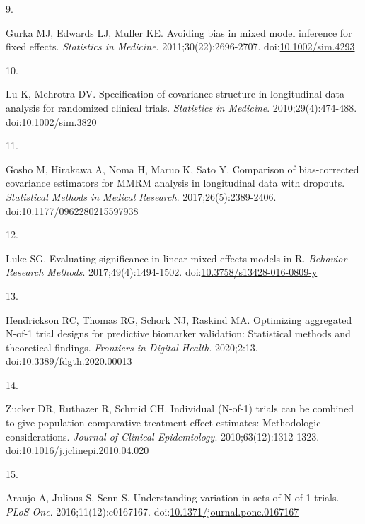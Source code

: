 \documentclass[
  11pt,
]{article}
\newlength{\cslhangindent}
\newlength{\csllabelwidth}
\newenvironment{CSLReferences}[2] %
 {\begin{list}{}{%
  \setlength{\itemindent}{0pt}
  \setlength{\leftmargin}{0pt}
  \setlength{\parsep}{0pt}
  \ifodd #1
   \setlength{\leftmargin}{\cslhangindent}
   \setlength{\itemindent}{-1\cslhangindent}
  \fi
  \setlength{\itemsep}{#2\baselineskip}}}
 {\end{list}}
\newcommand{\CSLLeftMargin}[1]{\parbox[t]{\csllabelwidth}{\strut#1\strut}}
\newcommand{\CSLRightInline}[1]{\parbox[t]{\linewidth - \csllabelwidth}{\strut#1\strut}}
\begin{document}
\begin{CSLReferences}{0}{1}
\CSLLeftMargin{9. }%
\CSLRightInline{Gurka MJ, Edwards LJ, Muller KE. Avoiding bias in mixed model inference for fixed effects. \emph{Statistics in Medicine}. 2011;30(22):2696-2707. doi:\href{https://doi.org/10.1002/sim.4293}{10.1002/sim.4293}}

\CSLLeftMargin{10. }%
\CSLRightInline{Lu K, Mehrotra DV. Specification of covariance structure in longitudinal data analysis for randomized clinical trials. \emph{Statistics in Medicine}. 2010;29(4):474-488. doi:\href{https://doi.org/10.1002/sim.3820}{10.1002/sim.3820}}

\CSLLeftMargin{11. }%
\CSLRightInline{Gosho M, Hirakawa A, Noma H, Maruo K, Sato Y. Comparison of bias-corrected covariance estimators for {MMRM} analysis in longitudinal data with dropouts. \emph{Statistical Methods in Medical Research}. 2017;26(5):2389-2406. doi:\href{https://doi.org/10.1177/0962280215597938}{10.1177/0962280215597938}}

\CSLLeftMargin{12. }%
\CSLRightInline{Luke SG. Evaluating significance in linear mixed-effects models in {R}. \emph{Behavior Research Methods}. 2017;49(4):1494-1502. doi:\href{https://doi.org/10.3758/s13428-016-0809-y}{10.3758/s13428-016-0809-y}}

\CSLLeftMargin{13. }%
\CSLRightInline{Hendrickson RC, Thomas RG, Schork NJ, Raskind MA. Optimizing aggregated {N}-of-1 trial designs for predictive biomarker validation: Statistical methods and theoretical findings. \emph{Frontiers in Digital Health}. 2020;2:13. doi:\href{https://doi.org/10.3389/fdgth.2020.00013}{10.3389/fdgth.2020.00013}}

\CSLLeftMargin{14. }%
\CSLRightInline{Zucker DR, Ruthazer R, Schmid CH. Individual ({N}-of-1) trials can be combined to give population comparative treatment effect estimates: Methodologic considerations. \emph{Journal of Clinical Epidemiology}. 2010;63(12):1312-1323. doi:\href{https://doi.org/10.1016/j.jclinepi.2010.04.020}{10.1016/j.jclinepi.2010.04.020}}

\CSLLeftMargin{15. }%
\CSLRightInline{Araujo A, Julious S, Senn S. Understanding variation in sets of {N}-of-1 trials. \emph{PLoS One}. 2016;11(12):e0167167. doi:\href{https://doi.org/10.1371/journal.pone.0167167}{10.1371/journal.pone.0167167}}


\end{CSLReferences}
\end{document}
